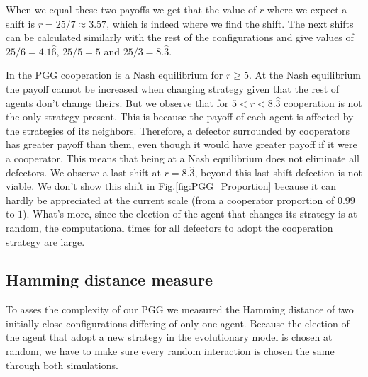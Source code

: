 When we equal these two payoffs we get that the value of $r$ where we expect a shift is $r=25/7\approx3.57$, which is indeed where we find the shift. The next shifts can be calculated similarly with the rest of the configurations and give values of $25/6=4.1\hat6$, $25/5=5$ and $25/3=8.\hat3$.


In the PGG cooperation is a Nash equilibrium for $r\geq5$. At the Nash equilibrium  the payoff cannot be increased when changing strategy given that the rest of agents don't change theirs. But we observe that for $5<r<8.\hat3$ cooperation is not the only strategy present. This is because the payoff of each agent is affected by the strategies of its neighbors. Therefore, a defector surrounded by cooperators has greater payoff than them, even though it would have greater payoff if it were a cooperator. This means that being at a Nash equilibrium does not eliminate all defectors. We observe a last shift at $r=8.\hat3$, beyond this last shift defection is not viable.  We don't show this shift in Fig.\ref{fig:PGG_Proportion} because it can hardly be appreciated at the current scale (from a cooperator proportion of $0.99$ to $1$). What's more, since the election of the agent that changes its strategy is at random, the computational times for all defectors to adopt the cooperation strategy are large.





\subsection{Hamming distance measure}


To asses the complexity of our PGG we measured the Hamming distance of two initially close configurations differing of only one agent. Because the election of the agent that adopt a new strategy in the evolutionary model is chosen at random, we have to make sure every random interaction is chosen the same through both simulations.



